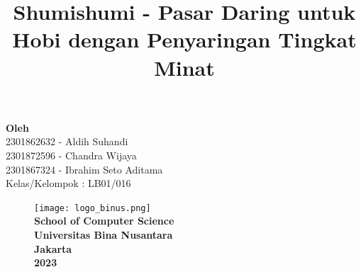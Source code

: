 \documentclass[a4paper]{article}
\begin{document}
\date{}
\title{Shumishumi - Pasar Daring untuk Hobi dengan Penyaringan Tingkat Minat}
\clearpage\maketitle
{}
\vspace{4em}%
\begin{center}
    \textbf{Oleh}\\%
    \vspace{0.10cm}%
    2301862632 - Aldih Suhandi\\%
    2301872596 - Chandra Wijaya\\%
    2301867324 - Ibrahim Seto Aditama\\%
    Kelas/Kelompok : LB01/016
\end{center}
\thispagestyle{empty}
\begin{figure}[h]
    \centering
    \texttt{[image: logo\_binus.png]}\\
    \textbf{School of Computer Science\\
    Universitas Bina Nusantara\\
    Jakarta\\
    2023}
\end{figure}

\newpage
{}


\newpage
{}


\newpage
{}


\newpage
{}


\newpage
{}
\tableofcontents

\newpage
{}
\listoftables

\newpage
{}
\listoffigures

\newpage
{}
\listofappendices
\end{document}
